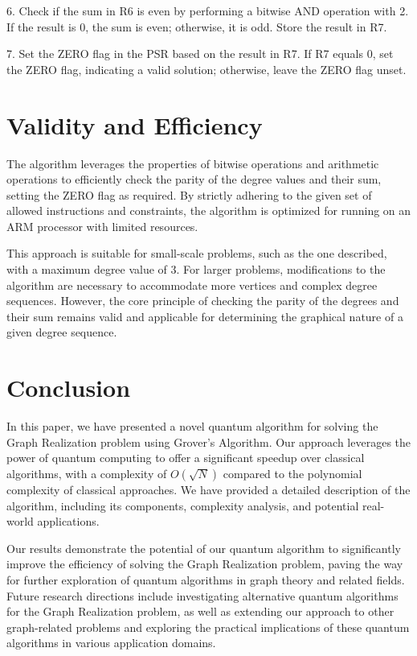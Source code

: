 6. Check if the sum in R6 is even by performing a bitwise AND operation with 2. If the result is 0, the sum is even; otherwise, it is odd. Store the result in R7.

7. Set the ZERO flag in the PSR based on the result in R7. If R7 equals 0, set the ZERO flag, indicating a valid solution; otherwise, leave the ZERO flag unset.

\section{Validity and Efficiency}

The algorithm leverages the properties of bitwise operations and arithmetic operations to efficiently check the parity of the degree values and their sum, setting the ZERO flag as required. By strictly adhering to the given set of allowed instructions and constraints, the algorithm is optimized for running on an ARM processor with limited resources.

This approach is suitable for small-scale problems, such as the one described, with a maximum degree value of 3. For larger problems, modifications to the algorithm are necessary to accommodate more vertices and complex degree sequences. However, the core principle of checking the parity of the degrees and their sum remains valid and applicable for determining the graphical nature of a given degree sequence.

\section{Conclusion}
\label{sec:conclusion}

In this paper, we have presented a novel quantum algorithm for solving the Graph Realization problem using Grover's Algorithm. Our approach leverages the power of quantum computing to offer a significant speedup over classical algorithms, with a complexity of $O(\sqrt{N})$ compared to the polynomial complexity of classical approaches. We have provided a detailed description of the algorithm, including its components, complexity analysis, and potential real-world applications.

Our results demonstrate the potential of our quantum algorithm to significantly improve the efficiency of solving the Graph Realization problem, paving the way for further exploration of quantum algorithms in graph theory and related fields. Future research directions include investigating alternative quantum algorithms for the Graph Realization problem, as well as extending our approach to other graph-related problems and exploring the practical implications of these quantum algorithms in various application domains.


